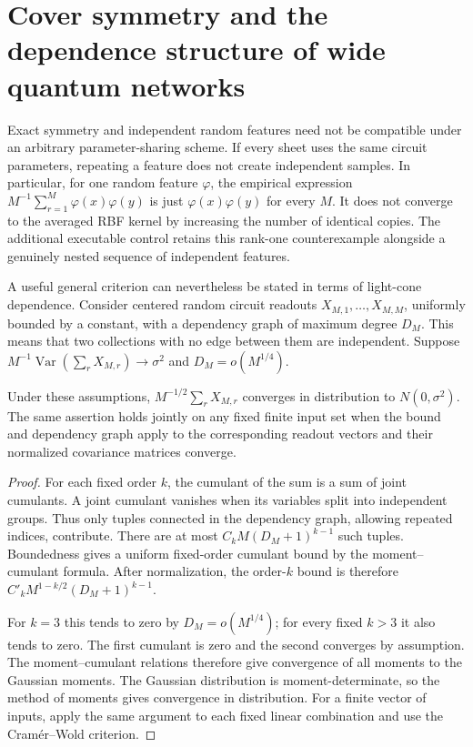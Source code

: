 \section{Cover symmetry and the dependence structure of wide quantum networks}

Exact symmetry and independent random features need not be compatible under an arbitrary parameter-sharing scheme. If every sheet uses the same circuit parameters, repeating a feature does not create independent samples. In particular, for one random feature $\varphi$, the empirical expression $M^{-1}\sum_{r=1}^M\varphi(x)\varphi(y)$ is just $\varphi(x)\varphi(y)$ for every $M$. It does not converge to the averaged RBF kernel by increasing the number of identical copies. The additional executable control retains this rank-one counterexample alongside a genuinely nested sequence of independent features.

A useful general criterion can nevertheless be stated in terms of light-cone dependence. Consider centered random circuit readouts $X_{M,1},\ldots,X_{M,M}$, uniformly bounded by a constant, with a dependency graph of maximum degree $D_M$. This means that two collections with no edge between them are independent. Suppose $M^{-1}\operatorname{Var}(\sum_rX_{M,r})\to\sigma^2$ and $D_M=o(M^{1/4})$.

\begin{proposition}
Under these assumptions, $M^{-1/2}\sum_rX_{M,r}$ converges in distribution to $N(0,\sigma^2)$. The same assertion holds jointly on any fixed finite input set when the bound and dependency graph apply to the corresponding readout vectors and their normalized covariance matrices converge.
\end{proposition}
\begin{proof}
For each fixed order $k$, the cumulant of the sum is a sum of joint cumulants. A joint cumulant vanishes when its variables split into independent groups. Thus only tuples connected in the dependency graph, allowing repeated indices, contribute. There are at most $C_kM(D_M+1)^{k-1}$ such tuples. Boundedness gives a uniform fixed-order cumulant bound by the moment--cumulant formula. After normalization, the order-$k$ bound is therefore $C'_kM^{1-k/2}(D_M+1)^{k-1}$.

For $k=3$ this tends to zero by $D_M=o(M^{1/4})$; for every fixed $k>3$ it also tends to zero. The first cumulant is zero and the second converges by assumption. The moment--cumulant relations therefore give convergence of all moments to the Gaussian moments. The Gaussian distribution is moment-determinate, so the method of moments gives convergence in distribution. For a finite vector of inputs, apply the same argument to each fixed linear combination and use the Cram\'er--Wold criterion.
\end{proof}

